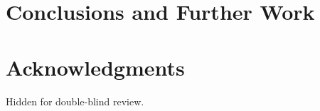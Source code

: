 \documentclass{sig-alternate}
\begin{document}



\section{Conclusions and Further Work}
\label{sec:conclusions}


\section{Acknowledgments}

Hidden for double-blind review. 

%

\begin{footnotesize}

\end{footnotesize}
\end{document}
